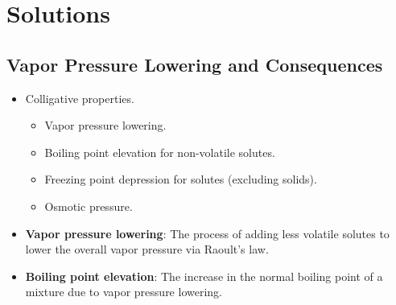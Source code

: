 \documentclass[../notes.tex]{subfiles}
\begin{document}
\chapter{Solutions}
\section{Vapor Pressure Lowering and Consequences}
\begin{itemize}
    \item {}Colligative properties.
    \begin{itemize}
        \item Vapor pressure lowering.
        \item Boiling point elevation for non-volatile solutes.
        \item Freezing point depression for solutes (excluding solids).
        \item Osmotic pressure.
    \end{itemize}
    \item \textbf{Vapor pressure lowering}: The process of adding less volatile solutes to lower the overall vapor pressure via Raoult's law.
    \item \textbf{Boiling point elevation}: The increase in the normal boiling point of a mixture due to vapor pressure lowering.
    \begin{figure}[h!]
        \centering
\end{figure}
\end{itemize}
\end{document}
